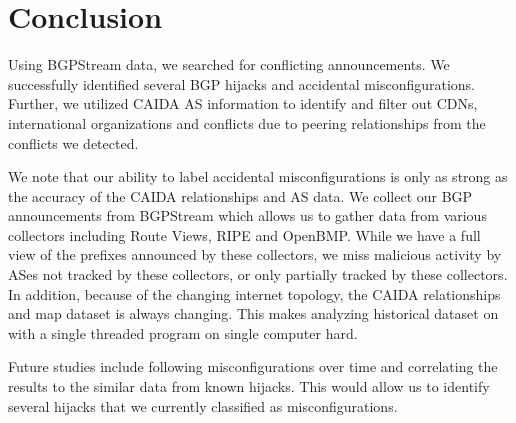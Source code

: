 \section{Conclusion}

Using BGPStream data, we searched for conflicting announcements. We successfully identified several BGP hijacks and accidental misconfigurations. Further, we utilized CAIDA AS information to identify and filter out CDNs, international organizations and conflicts due to peering relationships from the conflicts we detected.

We note that our ability to label accidental misconfigurations is only as strong as the accuracy of the CAIDA relationships and AS data. We collect  our BGP announcements from BGPStream which allows us to gather data from various collectors including Route Views, RIPE and OpenBMP. While we have a full view of the prefixes announced by these collectors, we miss malicious activity by ASes not tracked by these collectors, or only partially tracked by these collectors. In addition, because of the changing internet topology, the CAIDA relationships and map dataset is always changing. This makes analyzing historical dataset on with a single threaded program on single computer hard. 

Future studies include following misconfigurations over time and correlating the results to the similar data from known hijacks. This would allow us to identify several hijacks that we currently classified as misconfigurations.